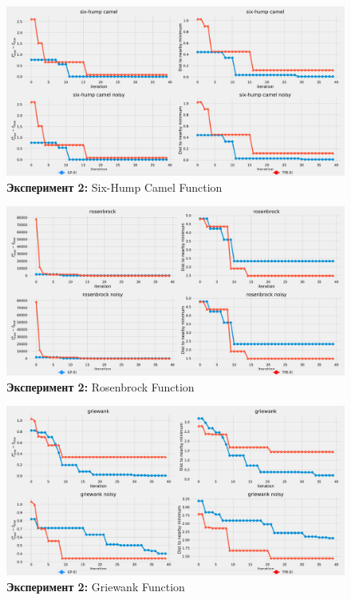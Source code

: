 \documentclass[12pt,fleqn]{article}
\begin{document}
	\begin{figure}[!h]
		\includegraphics[scale=0.25,center]{../code/exp2/hump.pdf}
		\caption{\textbf{Эксперимент 2:} Six-Hump Camel Function}
		\label{fig:exp2_hump}
	\end{figure}
	
	\begin{figure}[!h]
		\includegraphics[scale=0.25,center]{../code/exp2/rosenbrock.pdf}
		\caption{\textbf{Эксперимент 2:} Rosenbrock Function}
		\label{fig:exp2_rosenbrock}
	\end{figure}
	
	\begin{figure}[!h]
		\includegraphics[scale=0.25,center]{../code/exp2/griewank.pdf}
		\caption{\textbf{Эксперимент 2:} Griewank Function}
		\label{fig:exp2_griewank}
	\end{figure}
	
\end{document}
